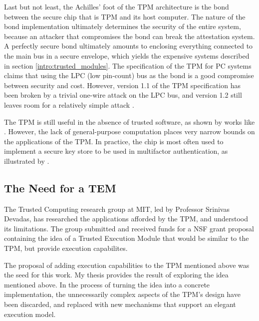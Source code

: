 Last but not least, the Achilles' foot of the TPM architecture is the bond
between the secure chip that is TPM and its host computer. The nature of the
bond implementation ultimately determines the security of the entire system,
because an attacker that compromises the bond can break the attestation system.
A perfectly secure bond ultimately amounts to enclosing everything connected
to the main bus in a secure envelope, which yields the expensive systems
described in section \ref{intro:trusted_modules}. The specification of the TPM
for PC systems claims that using the LPC (low pin-count) bus
\cite{intel2002lpc} as the bond is a good compromise between security and cost.
However, version 1.1 of the TPM specification has been broken by a trivial
one-wire attack \cite{lawson2007tha} on the LPC bus, and version 1.2 still
leaves room for a relatively simple attack \cite{lawson2007tha2}.

The TPM is still useful in the absence of trusted software, as shown by works
like \cite{sarmenta2006vmc}. However, the lack of general-purpose
computation places very narrow bounds on the applications of the TPM. In
practice, the chip is most often used to implement a secure key store to be
used in multifactor authentication, as illustrated by \cite{yoderpkcs11}.

\subsection{The Need for a TEM}
The Trusted Computing research group at MIT, led by Professor Srinivas Devadas,
has researched the applications afforded by the TPM, and understood its
limitations. The group submitted and received funds for a NSF grant proposal
containing the idea of a Trusted Execution Module that would be similar to the TPM, but provide
execution capabilites.

The proposal of adding execution capabilities to the TPM mentioned above was
the seed for this work. My thesis provides the result of exploring the idea
mentioned above. In the process of turning the idea into a concrete
implementation, the unnecessarily complex aspects of the TPM's design have been
discarded, and replaced with new mechanisms that support an elegant execution
model.
